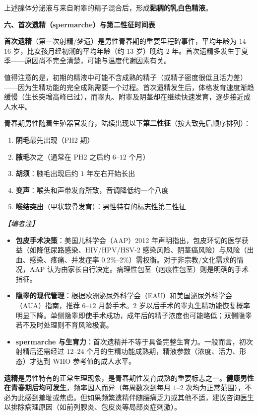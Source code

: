 上述腺体分泌液与来自附睾的精子混合后，形成\textbf{黏稠的乳白色精液}。

\vspace{0.3em}
\noindent\textbf{六、首次遗精（spermarche）与第二性征时间表}

\textbf{首次遗精}（第一次射精/梦遗）是男性青春期的重要里程碑事件，平均年龄为 $14$--$16$ 岁，比女孩月经初潮的平均年龄（约 $13$ 岁）晚约 $2$ 年。首次遗精多发生于夏季——原因尚不完全清楚，可能与温度代谢因素有关。

值得注意的是，初期的精液中可能不含成熟的精子（或精子密度很低且活力差）——因为生精功能的完全成熟需要一个过程。首次遗精发生后，体格发育速度渐趋缓慢（生长突增高峰已过），而睾丸、附睾及阴茎却在继续快速发育，逐步接近成人水平。

青春期男性随着生殖器官发育，陆续出现以下\textbf{第二性征}（按大致先后顺序排列）：
\begin{enumerate}
	\item \textbf{阴毛}最先出现（PH2 期）
	\item \textbf{腋毛}次之（通常在 PH2 之后约 $6$--$12$ 个月）
	\item \textbf{胡须}：腋毛出现后约 $1$ 年左右开始长出
	\item \textbf{变声}：喉头和声带发育所致，音调降低约一个八度
	\item \textbf{喉结突出}（甲状软骨发育）：男性特有的标志性第二性征
\end{enumerate}

\vspace{0.5em}
\noindent\textit{【编者注】}
\begin{itemize}
	\item \textbf{包皮手术决策}：美国儿科学会（AAP）2012 年声明指出，包皮环切的医学获益（如降低尿路感染、HIV/HPV/HSV-2 感染风险、阴茎癌风险）与风险（出血、感染、疼痛、并发症率 $0.2\%$--$2\%$）需权衡。对于非宗教/文化需求的情况，AAP 认为由家长自行决定。病理性包茎（疤痕性包茎）则是明确的手术指征。
	\item \textbf{隐睾的现代管理}：根据欧洲泌尿外科学会（EAU）和美国泌尿外科学会（AUA）指南，推荐 $6$--$12$ 月龄手术。$2$ 岁以后手术的睾丸生精功能恢复概率明显下降。单侧隐睾即使手术成功，成年后的精子浓度也可能略低；双侧隐睾若不及时处理则不育风险极高。
	\item \textbf{spermarche 与生育力}：首次遗精并不等于具备完整生育力。一般而言，初次射精后还需经过 $12$--$24$ 个月的生精功能成熟期，精液参数（浓度、活力、形态）才达到 WHO 参考值的成人水平。
\end{itemize}

\begin{tcolorbox}[colback=pink!5!white,colframe=red!50!black,title=贴心小叮咛]
\textbf{遗精}是男性特有的正常生理现象，是青春期性发育成熟的重要标志之一。\textbf{健康男性在青春期后均可发生}，频率因人而异（每周数次到每月 $1$--$2$ 次均为正常范围），不必为此感到羞耻或焦虑。但如果频繁遗精伴随腰痛乏力或其他不适，建议咨询医生以排除病理原因（如前列腺炎、包皮炎等局部炎症刺激）。
\end{tcolorbox}

